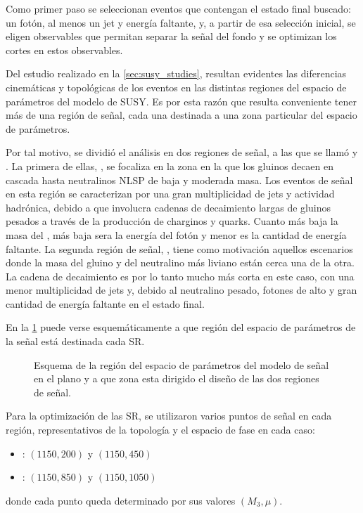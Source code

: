 Como primer paso se seleccionan eventos que contengan el estado final buscado:
un fotón, al menos un jet y energía faltante, y, a partir de esa selección
inicial, se eligen observables que permitan separar la señal del fondo y se
optimizan los cortes en estos observables.

Del estudio realizado en la \cref{sec:susy_studies}, resultan evidentes las diferencias
cinemáticas y topológicas de los eventos en las distintas regiones del
espacio de parámetros {\mgmn} del modelo de SUSY.
Es por esta razón que resulta conveniente tener más de una región de señal,
cada una destinada a una zona particular del espacio de parámetros.

Por tal motivo, se dividió el análisis en dos regiones de señal, a las que se
llamó {\SRL} y {\SRH}. La primera de ellas, \SRL, se focaliza en la zona en la que
los gluinos decaen en cascada hasta neutralinos NLSP de baja y
moderada masa. Los eventos de señal en esta región se caracterizan por una gran
multiplicidad de jets y actividad hadrónica, debido a que involucra cadenas de
decaimiento largas de gluinos pesados a través de la producción de charginos y quarks.
Cuanto más baja la masa del {\ninoone}, más baja sera la energía del fotón y
menor es la cantidad de energía faltante. La segunda región de señal, \SRH,
tiene como motivación aquellos escenarios donde la masa del gluino y del neutralino
más liviano están cerca una de la otra. La cadena de decaimiento es por lo tanto
mucho más corta en este caso, con una menor multiplicidad de jets y, debido al
neutralino pesado, fotones de alto {\pt} y gran cantidad de energía faltante en
el estado final.

En la \cref{fig:srs_motivation} puede verse esquemáticamente a que región del espacio
de parámetros de la señal {\mgmn} está destinada cada SR.

\begin{figure}[!htbp]
  \centering
    \resizebox{0.5\textwidth}{!}{
      
      }
    \caption{Esquema de la región del espacio de parámetros del modelo de señal en el
    plano {\mgmn} y a que zona esta dirigido el diseño de las dos regiones de señal.}
  \label{fig:srs_motivation}
\end{figure}


Para la optimización de las SR, se utilizaron varios puntos de señal en cada región,
representativos de la topología y el espacio de fase en cada caso:

\begin{itemize}\itemsep0.2cm\parskip0.2cm
\item {\SRL}: $(1150, 200)$ y $(1150, 450)$
\item {\SRH}: $(1150, 850)$ y $(1150, 1050)$
\end{itemize}
%
donde cada punto queda determinado por sus valores $(M_3, \mu)$.

